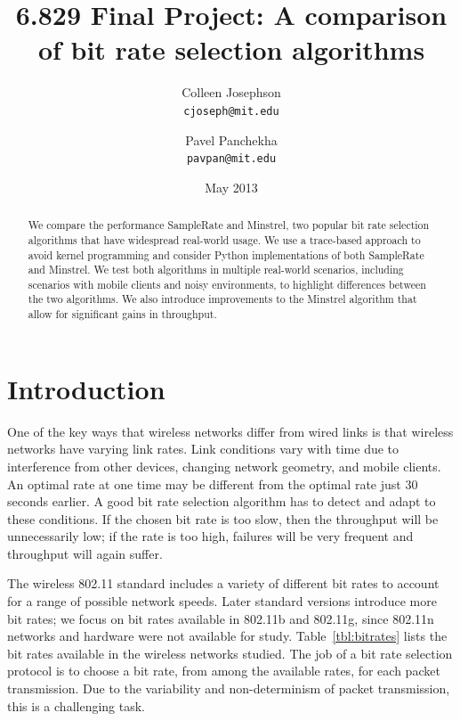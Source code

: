 \documentclass[twocolumn,10pt]{article}
\title{6.829 Final Project: A comparison of bit rate selection algorithms}
\author{Colleen Josephson \\ \texttt{cjoseph@mit.edu}
  \and Pavel Panchekha \\ \texttt{pavpan@mit.edu}}
\date{May 2013}
\begin{document}
\maketitle

\begin{abstract}
We compare the performance SampleRate and Minstrel, two popular
bit rate selection algorithms that have widespread real-world usage.
We use a trace-based approach to avoid kernel programming and consider
Python implementations of both SampleRate and Minstrel.  We test both
algorithms in multiple real-world scenarios, including scenarios with
mobile clients and noisy environments, to highlight differences
between the two algorithms.  We also introduce improvements to the
Minstrel algorithm that allow for significant gains in throughput.
\end{abstract}

\section{Introduction}

One of the key ways that wireless networks differ from wired links is
that wireless networks have varying link rates.  Link conditions vary
with time due to interference from other devices, changing network
geometry, and mobile clients.  An optimal rate at one time may be
different from the optimal rate just 30 seconds earlier.  A good
bit rate selection algorithm has to detect and adapt to these
conditions.  If the chosen bit rate is too slow, then the throughput
will be unnecessarily low; if the rate is too high, failures will be
very frequent and throughput will again suffer.

The wireless 802.11 standard includes a variety of different bit rates
to account for a range of possible network speeds.  Later standard
versions introduce more bit rates; we focus on bit rates available in
802.11b and 802.11g, since 802.11n networks and hardware were not
available for study.  Table~\ref{tbl:bitrates} lists the bit rates
available in the wireless networks studied.  The job of a bit rate
selection protocol is to choose a bit rate, from among the available
rates, for each packet transmission.  Due to the variability and
non-determinism of packet transmission, this is a challenging task.
\end{document}
